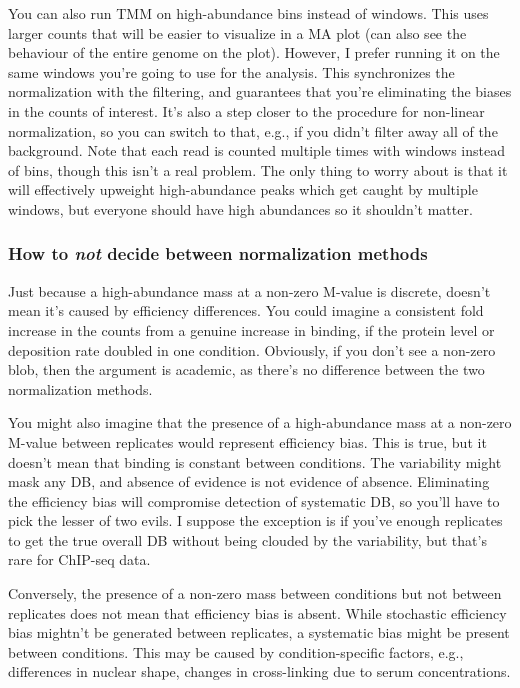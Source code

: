 \documentclass[12pt]{report}
\begin{document}
You can also run TMM on high-abundance bins instead of windows.
This uses larger counts that will be easier to visualize in a MA plot (can also see the behaviour of the entire genome on the plot).
However, I prefer running it on the same windows you're going to use for the analysis.
This synchronizes the normalization with the filtering, and guarantees that you're eliminating the biases in the counts of interest.
It's also a step closer to the procedure for non-linear normalization, so you can switch to that, e.g., if you didn't filter away all of the background.
Note that each read is counted multiple times with windows instead of bins, though this isn't a real problem.
The only thing to worry about is that it will effectively upweight high-abundance peaks which get caught by multiple windows, but everyone should have high abundances so it shouldn't matter.

\subsubsection*{How to \textit{not} decide between normalization methods}

Just because a high-abundance mass at a non-zero M-value is discrete, doesn't mean it's caused by efficiency differences.
You could imagine a consistent fold increase in the counts from a genuine increase in binding, if the protein level or deposition rate doubled in one condition.
Obviously, if you don't see a non-zero blob, then the argument is academic, as there's no difference between the two normalization methods.

You might also imagine that the presence of a high-abundance mass at a non-zero M-value between replicates would represent efficiency bias.
This is true, but it doesn't mean that binding is constant between conditions.
The variability might mask any DB, and absence of evidence is not evidence of absence.
Eliminating the efficiency bias will compromise detection of systematic DB, so you'll have to pick the lesser of two evils.
I suppose the exception is if you've enough replicates to get the true overall DB without being clouded by the variability, but that's rare for ChIP-seq data.

Conversely, the presence of a non-zero mass between conditions but not between replicates does not mean that efficiency bias is absent.
While stochastic efficiency bias mightn't be generated between replicates, a systematic bias might be present between conditions.
This may be caused by condition-specific factors, e.g., differences in nuclear shape, changes in cross-linking due to serum concentrations.
\end{document}

